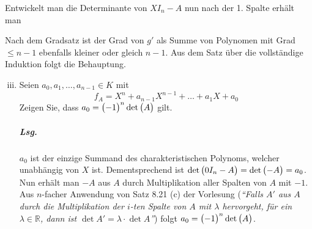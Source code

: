 \documentclass{scrreprt}
\newcommand{\Grad}{\text{Grad}}
\newcommand{\Spur}{\text{Spur}}
\begin{document}
\begin{landscape}
\begin{enumerate}[(i)]
  Entwickelt man die Determinante von $XI_n - A$ nun nach der 1. Spalte erhält
  man
  Nach dem Gradsatz ist der Grad von $g'$ als Summe von Polynomen mit Grad $\leq n - 1$
  ebenfalls kleiner oder gleich $n - 1$.
  Aus dem Satz über die vollständige Induktion folgt die Behauptung.
\end{enumerate}
\end{landscape}
\newpage
\begin{enumerate}[(i)]
\setcounter{enumi}{2}
\item Seien $a_0, a_1, \ldots, a_{n - 1} \in K$ mit
  \[
    f_A = X^n + a_{n - 1} X^{n - 1} + \ldots + a_1X + a_0
  \]
  Zeigen Sie, dass $a_0 = \qty\big(-1)^n \det\qty\big(A)$ gilt.

  \subparagraph{Lsg.} $a_0$ ist der einzige Summand des charakteristischen
  Polynoms, welcher unabhängig von $X$ ist.
  Dementsprechend ist $\det\qty\big(0I_n - A) = \det\qty\big(-A) = a_0$.
  Nun erhält man $-A$ aus $A$ durch Multiplikation aller Spalten von $A$
  mit $-1$.
  Aus $n$-facher Anwendung von Satz 8.21 (c) der Vorlesung
  (\emph{``Falls $A'$ aus $A$ durch die
    Multiplikation der $i$-ten Spalte von $A$ mit $\lambda$ hervorgeht,
    für ein $\lambda \in \mathbb{R}$, dann ist
    $\det A' = \lambda \cdot \det A$''})
  folgt $a_0 = \qty\big(-1)^n \det\qty\big(A)$.
\end{enumerate}
\end{document}
